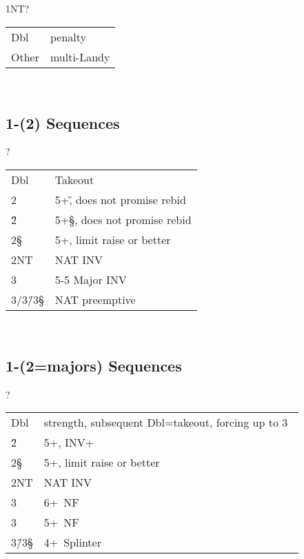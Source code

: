 \begin{bidding}
\>\D\>1NT\>?
\end{bidding}

\begin{xtabular}{ll}
Dbl & penalty \\
Other & multi-Landy 
\end{xtabular}\\


\subsection{1\D-(2\C) Sequences}

\begin{bidding}
\>\D{}\C\>?
\end{bidding}

\begin{xtabular}{ll}
Dbl & Takeout \\
2\D & 5+\H, does not promise rebid \\
2\H & 5+\S, does not promise rebid \\
2\S & 5+\D, limit raise or better \\
2NT & NAT INV \\
3\C & 5-5 Major INV \\
3\D/3\H/3\S & NAT preemptive \\  
\end{xtabular}\\


\subsection{1\D-(2\D=majors) Sequences}

\begin{bidding}
\>\D{}\D\>?
\end{bidding}

\begin{xtabular}{ll}
Dbl & strength, subsequent Dbl=takeout, forcing up to 3\D\ \\
2\H & 5+\C, INV+ \\
2\S & 5+\D, limit raise or better \\
2NT & NAT INV \\
3\C & 6+\C\ NF \\
3\D & 5+\D\ NF \\
3\H/3\S & 4+\D\ Splinter \\  
\end{xtabular}\\

